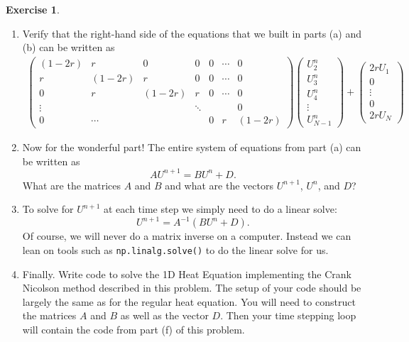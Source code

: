 \documentclass[
]{book}
\theoremstyle{definition}
\theoremstyle{definition}
\theoremstyle{definition}
\newtheorem{exercise}{Exercise}[chapter]
\theoremstyle{remark}
\begin{document}
\begin{exercise}
\begin{enumerate}
\[\begin{aligned}
\begin{pmatrix}
                      \\U^{n+1}_{N-1}   
                  \end{pmatrix}
              \end{aligned}\]
\item
  Verify that the right-hand side of the equations that we built in
  parts (a) and (b) can be written as \[\begin{aligned}
                  \begin{pmatrix}
                      (1-2r) & r & 0 & 0 & 0 & \cdots & 0 \\
                      r & (1-2r) & r & 0 & 0 & \cdots & 0 \\
                      0 & r & (1-2r) & r & 0 & \cdots & 0 \\
                      \vdots & &  & \ddots &  & & 0 \\
                      0 & \cdots & & & 0 & r & (1-2r)
                  \end{pmatrix} 
                  \begin{pmatrix} 
                      U^{n}_2 \\ U^{n}_3 \\ U^{n}_4 \\ \vdots
                      \\U^{n}_{N-1}   
                  \end{pmatrix} + 
                  \begin{pmatrix}
                      2rU_1 \\ 0 \\ \vdots \\ 0 \\ 2rU_N 
                  \end{pmatrix}
              \end{aligned}\]
\item
  Now for the wonderful part! The entire system of equations from
  part (a) can be written as \[A U^{n+1} = B U^n + D.\] What are the
  matrices \(A\) and \(B\) and what are the vectors \(U^{n+1}\), \(U^n\), and
  \(D\)?
\item
  To solve for \(U^{n+1}\) at each time step we simply need to do a linear solve: \[U^{n+1} = A^{-1} \left( B U^n + D \right).\] Of course, we will never do a matrix inverse on a computer. Instead we can lean on tools such as \texttt{np.linalg.solve()} to do the linear solve for us.
\item
  Finally. Write code to solve the 1D Heat Equation implementing the
  Crank Nicolson method described in this problem. The setup of your
  code should be largely the same as for the regular heat equation.
  You will need to construct the matrices \(A\) and \(B\) as well as the
  vector \(D\). Then your time stepping loop will contain the code from
  part (f) of this problem.
\end{enumerate}
\end{exercise}
\end{document}
